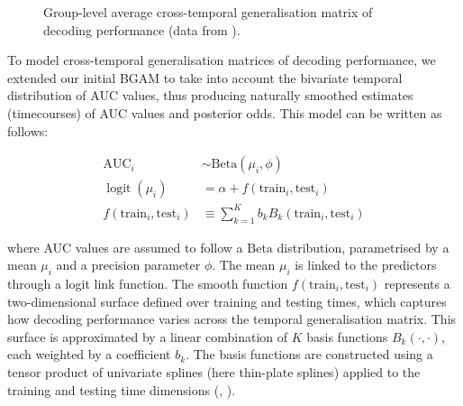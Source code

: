 \documentclass[
  doc,
  floatsintext,
  longtable,
  a4paper,
  nolmodern,
  notxfonts,
  notimes,
  colorlinks=true,linkcolor=blue,citecolor=blue,urlcolor=blue]{apa7}
\begin{document}
\begin{figure}[!htb]

\caption{\label{fig-timegen}Group-level average cross-temporal
generalisation matrix of decoding performance (data from
).}


\end{figure}%

\setlength{\parindent}{0pt}
\setlength{\parskip}{6pt}

To model cross-temporal generalisation matrices of decoding performance,
we extended our initial BGAM to take into account the bivariate temporal
distribution of AUC values, thus producing naturally smoothed estimates
(timecourses) of AUC values and posterior odds. This model can be
written as follows:

\[
\begin{aligned}
\text{AUC}_{i} &\sim \mathrm{Beta} \left(\mu_{i}, \phi\right)\\
\operatorname{logit} \left(\mu_{i} \right) &= \alpha + f \left(\text{train}_{i}, \text{test}_{i} \right)\\
f \left(\text{train}_{i}, \text{test}_{i} \right) &\equiv \sum_{k=1}^K b_{k} B_{k}\left(\text{train}_{i}, \text{test}_{i} \right)
\end{aligned}
\]

\setlength{\parindent}{0pt}
\setlength{\parskip}{6pt}

where AUC values are assumed to follow a \(\mathrm{Beta}\) distribution,
parametrised by a mean \(\mu_{i}\) and a precision parameter \(\phi\).
The mean \(\mu_{i}\) is linked to the predictors through a logit link
function. The smooth function \(f(\text{train}_{i}, \text{test}_{i})\)
represents a two-dimensional surface defined over training and testing
times, which captures how decoding performance varies across the
temporal generalisation matrix. This surface is approximated by a linear
combination of \(K\) basis functions \(B_{k}(\cdot, \cdot)\), each
weighted by a coefficient \(b_{k}\). The basis functions are constructed
using a tensor product of univariate splines (here thin-plate splines)
applied to the training and testing time dimensions
(, ).
\end{document}

